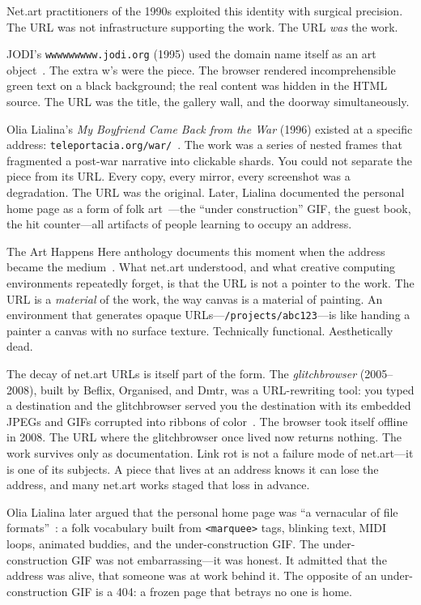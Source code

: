 \documentclass[10pt,letterpaper,twocolumn]{article}
\newcommand{\code}[1]{\texttt{#1}}
\begin{document}
Net.art practitioners of the 1990s exploited this identity with surgical precision. The URL was not infrastructure supporting the work. The URL \emph{was} the work.

JODI's \code{wwwwwwwww.jodi.org} (1995) used the domain name itself as an art object~\citep{jodi1995wwwwwwwww}. The extra w's were the piece. The browser rendered incomprehensible green text on a black background; the real content was hidden in the HTML source. The URL was the title, the gallery wall, and the doorway simultaneously.

Olia Lialina's \emph{My Boyfriend Came Back from the War} (1996) existed at a specific address: \code{teleportacia.org/war/}~\citep{lialina1996boyfriend}. The work was a series of nested frames that fragmented a post-war narrative into clickable shards. You could not separate the piece from its URL. Every copy, every mirror, every screenshot was a degradation. The URL was the original. Later, Lialina documented the personal home page as a form of folk art~\citep{lialina2005vernacular}---the ``under construction'' GIF, the guest book, the hit counter---all artifacts of people learning to occupy an address.

The Art Happens Here anthology documents this moment when the address became the medium~\citep{connor2019artanthology}. What net.art understood, and what creative computing environments repeatedly forget, is that the URL is not a pointer to the work. The URL is a \emph{material} of the work, the way canvas is a material of painting. An environment that generates opaque URLs---\code{/projects/abc123}---is like handing a painter a canvas with no surface texture. Technically functional. Aesthetically dead.

The decay of net.art URLs is itself part of the form. The \emph{glitchbrowser} (2005--2008), built by Beflix, Organised, and Dmtr, was a URL-rewriting tool: you typed a destination and the glitchbrowser served you the destination with its embedded JPEGs and GIFs corrupted into ribbons of color~\citep{menkman2011glitch}. The browser took itself offline in 2008. The URL where the glitchbrowser once lived now returns nothing. The work survives only as documentation. Link rot is not a failure mode of net.art---it is one of its subjects. A piece that lives at an address knows it can lose the address, and many net.art works staged that loss in advance.

Olia Lialina later argued that the personal home page was ``a vernacular of file formats''~\citep{lialina2005vernacular}: a folk vocabulary built from \code{<marquee>} tags, blinking text, MIDI loops, animated buddies, and the under-construction GIF. The under-construction GIF was not embarrassing---it was honest. It admitted that the address was alive, that someone was at work behind it. The opposite of an under-construction GIF is a 404: a frozen page that betrays no one is home.
\end{document}
